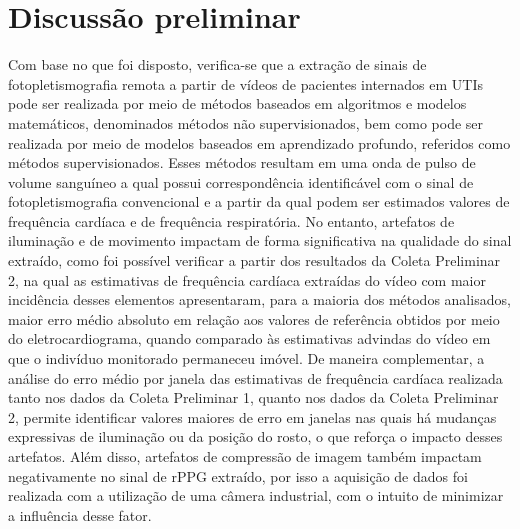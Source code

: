 \chapter{Discussão preliminar}

Com base no que foi disposto, verifica-se que a extração de sinais de fotopletismografia remota a partir de vídeos de pacientes internados em UTIs pode ser realizada por meio de métodos baseados em algoritmos e modelos matemáticos, denominados métodos não supervisionados, bem como pode ser realizada por meio de modelos baseados em aprendizado profundo, referidos como métodos supervisionados. Esses métodos resultam em uma onda de pulso de volume sanguíneo a qual possui  correspondência identificável com o sinal de fotopletismografia convencional e a partir da qual podem ser estimados valores de frequência cardíaca e de frequência respiratória. No entanto,  artefatos de iluminação e de movimento impactam de forma significativa na qualidade do sinal extraído, como foi possível verificar a partir dos resultados da Coleta Preliminar 2, na qual as estimativas de frequência cardíaca extraídas do vídeo com maior incidência desses elementos apresentaram, para a maioria dos métodos analisados, maior erro médio absoluto em relação aos valores de referência obtidos por meio do eletrocardiograma, quando comparado às estimativas advindas do vídeo em que o indivíduo monitorado permaneceu imóvel. De maneira complementar, a análise do erro médio por janela das estimativas de frequência cardíaca realizada tanto nos dados da Coleta Preliminar 1, quanto nos dados da Coleta Preliminar 2, permite identificar valores maiores de erro em janelas nas quais há mudanças expressivas de iluminação ou da posição do rosto, o que reforça o impacto desses artefatos. Além disso, artefatos de compressão de imagem também impactam negativamente no sinal de rPPG extraído, por isso a aquisição de dados foi realizada com a utilização de uma câmera industrial, com o intuito de minimizar a influência desse fator.

